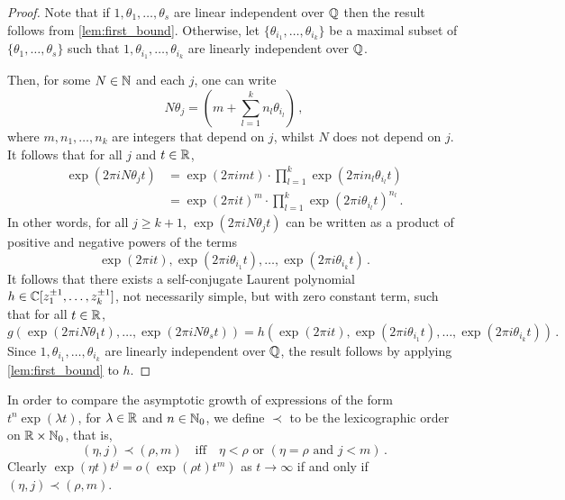 \begin{proof}
Note that if $1, \theta_{1}, \ldots, \theta_{s}$ are linear independent over $\mathbb{Q}$ then the result follows from \cref{lem:first_bound}.
Otherwise, let $\lbrace \theta_{i_{1}}, \ldots, \theta_{i_{k}} \rbrace$ be a maximal subset of $\lbrace \theta_{1}, \ldots, \theta_{s} \rbrace$ such that $1, \theta_{i_{1}}, \ldots, \theta_{i_{k}}$ are linearly independent over $\mathbb{Q}$.

Then, for some $N\in\mathbb{N}$ and each $j$, one can write
\begin{equation*}
N\theta_{j}= \left( m  +\sum\limits_{l=1}^{k} n_{l}\theta_{i_{l}} \right) \, ,
\end{equation*}
where $m,n_{1},\ldots,n_{k}$ are integers that depend on $j$, whilst $N$ does not depend on $j$. It follows that for all $j$ and $t \in \mathbb{R}$,
\begin{align*}
\exp(2 \pi i N\theta_{j} t) &= \exp( 2 \pi i m t) \cdot \prod\limits_{l=1}^{k} \exp(2 \pi i  n_{l} \theta_{i_{l}} t) \\
&= \exp(2 \pi i t)^{m} \cdot \prod\limits_{l=1}^{k} \exp(2 \pi i \theta_{i_{l}} t)^{n_{l}}  \, .
\end{align*}
In other words, for all $j \geq k+1$, $\exp(2 \pi i N \theta_{j} t)$ can be written as a product of positive and negative powers of the terms
\begin{equation*}
  \exp(2 \pi i t), \exp(2 \pi i \theta_{i_{1}} t), \ldots, \exp(2 \pi i \theta_{i_{k}} t) \, .
\end{equation*}
It follows that there exists a self-conjugate Laurent polynomial
$h\in\mathbb{C} [z_1^{\pm 1},\ldots,z_k^{\pm 1}]$, not necessarily
simple, but with zero constant term, such that for all
$t\in \mathbb{R}$,
\[ g(\exp(2 \pi i N \theta_{1} t), \ldots, \exp(2 \pi i N \theta_{s} t)) =
h(\exp(2 \pi i t), \exp(2 \pi i \theta_{i_{1}} t),\ldots,\exp(2 \pi i \theta_{i_{k}} t)) \, .\]
Since $1, \theta_{i_{1}}, \ldots, \theta_{i_{k}}$ are linearly independent over $\mathbb{Q}$, the result follows by applying \cref{lem:first_bound}
to $h$.
\end{proof}

In order to compare the asymptotic growth of expressions of the form
$t^{n}\exp(\lambda t)$, for $\lambda\in\mathbb{R}$ and
$n\in\mathbb{N}_0$, we define $\prec$ to be the lexicographic order on
$\mathbb{R}\times\mathbb{N}_{0}$, that is,
\begin{equation*}
(\eta,j)\prec (\rho,m) \quad \mbox{iff} \quad
\eta<\rho \mbox{ or } (\eta = \rho \mbox{ and } j< m) \, .
\end{equation*}
Clearly $\exp(\eta t)t^{j}=o(\exp(\rho t)t^{m})$ as $t\rightarrow \infty$ if and only if $(\eta,j)\prec (\rho,m)$.

